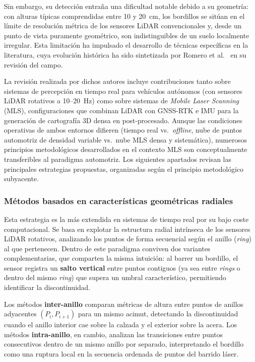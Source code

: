Sin embargo, su detección entraña una dificultad notable debido a su
geometría: con alturas típicas comprendidas entre 10 y 20~cm, los
bordillos se sitúan en el límite de resolución métrica de los sensores
LiDAR convencionales y, desde un punto de vista puramente geométrico,
son indistinguibles de un suelo localmente irregular. Esta limitación
ha impulsado el desarrollo de técnicas específicas en la literatura,
cuya evolución histórica ha sido sintetizada por Romero et
al.~\cite{romero2021curb} en su revisión del campo.

La revisión realizada por dichos autores incluye contribuciones tanto
sobre sistemas de percepción en tiempo real para vehículos autónomos
(con sensores LiDAR rotativos a 10--20~Hz) como sobre sistemas de
\textit{Mobile Laser Scanning} (MLS), configuraciones que combinan
LiDAR con GNSS-RTK e IMU para la generación de cartografía 3D densa en
post-procesado. Aunque las condiciones operativas de ambos entornos
difieren (tiempo real vs.\ \textit{offline}, nube de puntos automotriz
de densidad variable vs.\ nube MLS densa y sistemática), numerosos
principios metodológicos desarrollados en el contexto MLS son
conceptualmente transferibles al paradigma automotriz. Los siguientes
apartados revisan las principales estrategias propuestas, organizadas
según el principio metodológico subyacente.

\subsubsection{Métodos basados en características geométricas radiales}
\label{sec:curbs-radiales}

Esta estrategia es la más extendida en sistemas de tiempo real por su
bajo coste computacional. Se basa en explotar la estructura radial
intrínseca de los sensores LiDAR rotativos, analizando los puntos de
forma secuencial según el anillo (\textit{ring}) al que pertenecen.
Dentro de este paradigma conviven dos variantes complementarias, que
comparten la misma intuición: al barrer un bordillo, el sensor registra
un \textbf{salto vertical} entre puntos contiguos (ya sea entre
\textit{rings} o dentro del mismo \textit{ring}) que supera un umbral
característico, permitiendo identificar la discontinuidad.

Los métodos \textbf{inter-anillo} comparan métricas de altura entre
puntos de anillos adyacentes $(P_i, P_{i+1})$ para un mismo acimut,
detectando la discontinuidad cuando el anillo interior cae sobre la
calzada y el exterior sobre la acera. Los métodos \textbf{intra-anillo},
en cambio, analizan las transiciones entre puntos consecutivos dentro
de un mismo anillo por separado, interpretando el bordillo como una
ruptura local en la secuencia ordenada de puntos del barrido láser.

